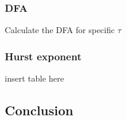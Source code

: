 \subsubsection{DFA}
Calculate the DFA for specific $\tau$

\subsubsection{Hurst exponent}
insert table here


\subsection{Conclusion}